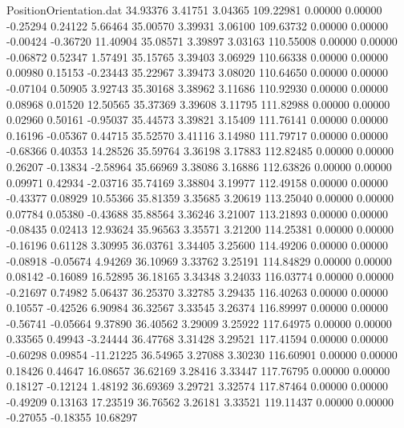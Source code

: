 \begin{filecontents}{PositionOrientation.dat}
  34.93376    3.41751    3.04365   109.22981    0.00000    0.00000   -0.25294    0.24122    5.66464
  35.00570    3.39931    3.06100   109.63732    0.00000    0.00000   -0.00424   -0.36720   11.40904
  35.08571    3.39897    3.03163   110.55008    0.00000    0.00000   -0.06872    0.52347    1.57491
  35.15765    3.39403    3.06929   110.66338    0.00000    0.00000    0.00980    0.15153   -0.23443
  35.22967    3.39473    3.08020   110.64650    0.00000    0.00000   -0.07104    0.50905    3.92743
  35.30168    3.38962    3.11686   110.92930    0.00000    0.00000    0.08968    0.01520   12.50565
  35.37369    3.39608    3.11795   111.82988    0.00000    0.00000    0.02960    0.50161   -0.95037
  35.44573    3.39821    3.15409   111.76141    0.00000    0.00000    0.16196   -0.05367    0.44715
  35.52570    3.41116    3.14980   111.79717    0.00000    0.00000   -0.68366    0.40353   14.28526
  35.59764    3.36198    3.17883   112.82485    0.00000    0.00000    0.26207   -0.13834   -2.58964
  35.66969    3.38086    3.16886   112.63826    0.00000    0.00000    0.09971    0.42934   -2.03716
  35.74169    3.38804    3.19977   112.49158    0.00000    0.00000   -0.43377    0.08929   10.55366
  35.81359    3.35685    3.20619   113.25040    0.00000    0.00000    0.07784    0.05380   -0.43688
  35.88564    3.36246    3.21007   113.21893    0.00000    0.00000   -0.08435    0.02413   12.93624
  35.96563    3.35571    3.21200   114.25381    0.00000    0.00000   -0.16196    0.61128    3.30995
  36.03761    3.34405    3.25600   114.49206    0.00000    0.00000   -0.08918   -0.05674    4.94269
  36.10969    3.33762    3.25191   114.84829    0.00000    0.00000    0.08142   -0.16089   16.52895
  36.18165    3.34348    3.24033   116.03774    0.00000    0.00000   -0.21697    0.74982    5.06437
  36.25370    3.32785    3.29435   116.40263    0.00000    0.00000    0.10557   -0.42526    6.90984
  36.32567    3.33545    3.26374   116.89997    0.00000    0.00000   -0.56741   -0.05664    9.37890
  36.40562    3.29009    3.25922   117.64975    0.00000    0.00000    0.33565    0.49943   -3.24444
  36.47768    3.31428    3.29521   117.41594    0.00000    0.00000   -0.60298    0.09854  -11.21225
  36.54965    3.27088    3.30230   116.60901    0.00000    0.00000    0.18426    0.44647   16.08657
  36.62169    3.28416    3.33447   117.76795    0.00000    0.00000    0.18127   -0.12124    1.48192
  36.69369    3.29721    3.32574   117.87464    0.00000    0.00000   -0.49209    0.13163   17.23519
  36.76562    3.26181    3.33521   119.11437    0.00000    0.00000   -0.27055   -0.18355   10.68297

\end{filecontents}
